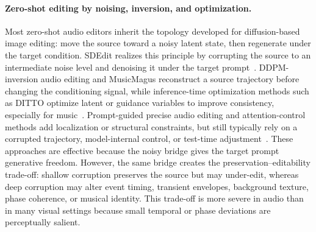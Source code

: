\paragraph{Zero-shot editing by noising, inversion, and optimization.}
Most zero-shot audio editors inherit the topology developed for diffusion-based image editing: move the source toward a noisy latent state, then regenerate under the target condition.
SDEdit realizes this principle by corrupting the source to an intermediate noise level and denoising it under the target prompt~\cite{meng2022sdeditguidedimagesynthesis}.
DDPM-inversion audio editing and MusicMagus reconstruct a source trajectory before changing the conditioning signal, while inference-time optimization methods such as DITTO optimize latent or guidance variables to improve consistency, especially for music~\cite{manor2024zeroshotunsupervisedtextbasedaudio,zhang2024musicmaguszeroshottexttomusicediting,novack2024dittodiffusioninferencetimetoptimization}.
Prompt-guided precise audio editing and attention-control methods add localization or structural constraints, but still typically rely on a corrupted trajectory, model-internal control, or test-time adjustment~\cite{xu2024promptguidedpreciseaudioediting,sioros2025editgenharnessingcrossattentioncontrol}.
These approaches are effective because the noisy bridge gives the target prompt generative freedom.
However, the same bridge creates the preservation--editability trade-off: shallow corruption preserves the source but may under-edit, whereas deep corruption may alter event timing, transient envelopes, background texture, phase coherence, or musical identity.
This trade-off is more severe in audio than in many visual settings because small temporal or phase deviations are perceptually salient.

